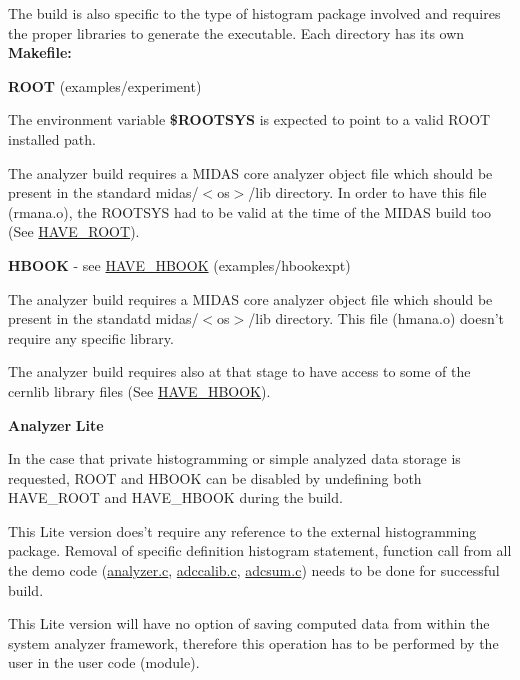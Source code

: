 \begin{DoxyItemize}
\item The build is also specific to the type of histogram package involved and requires the proper libraries to generate the executable. Each directory has its own {\bfseries Makefile:} 
\begin{DoxyItemize}
\item {\bfseries ROOT} (examples/experiment)
\begin{DoxyItemize}
\item The environment variable {\bfseries \$ROOTSYS} is expected to point to a valid ROOT installed path.
\item The analyzer build requires a MIDAS core analyzer object file which should be present in the standard midas/$<$os$>$/lib directory. In order to have this file {\bfseries }(rmana.o), the ROOTSYS had to be valid at the time of the MIDAS build too (See \hyperlink{BuildingOptions_BO_HAVE_ROOT}{HAVE\_\-ROOT}).
\end{DoxyItemize}
\item {\bfseries HBOOK} -\/ see \hyperlink{BuildingOptions_BO_HAVE_HBOOK}{HAVE\_\-HBOOK} (examples/hbookexpt)
\begin{DoxyItemize}
\item The analyzer build requires a MIDAS core analyzer object file which should be present in the standatd midas/$<$os$>$/lib directory. This file {\bfseries }(hmana.o) doesn't require any specific library.
\item The analyzer build requires also at that stage to have access to some of the cernlib library files (See \hyperlink{BuildingOptions_BO_HAVE_HBOOK}{HAVE\_\-HBOOK}).
\end{DoxyItemize}
\item {\bfseries Analyzer} {\bfseries Lite} 
\begin{DoxyItemize}
\item In the case that private histogramming or simple analyzed data storage is requested, ROOT and HBOOK can be disabled by undefining both HAVE\_\-ROOT and HAVE\_\-HBOOK during the build.
\item This Lite version does't require any reference to the external histogramming package. Removal of specific definition histogram statement, function call from all the demo code (\hyperlink{analyzer_8c}{analyzer.c}, \hyperlink{adccalib_8c}{adccalib.c}, \hyperlink{adcsum_8c}{adcsum.c}) needs to be done for successful build.
\item This Lite version will have no option of saving computed data from within the system analyzer framework, therefore this operation has to be performed by the user in the user code (module).
\end{DoxyItemize}
\end{DoxyItemize}
\end{DoxyItemize}

